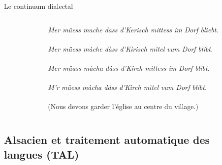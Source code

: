 \documentclass[french]{beamer}
\begin{document}
\begin{frame}{Le continuum dialectal}
  \begin{columns}
    \begin{column}{0.25\textwidth}
    \end{column}
    \begin{column}{0.85\textwidth}

      \small
      \textit{Mer müess mache dass d'Kerisch mittess im Dorf bliebt. \\~\\ %
        Mer müess màche  dàss d'Kìrisch mìtel vum Dorf blibt.\\~\\ %
        Mer müass màcha dàss d’Kîrch mittess îm Dorf blibt.\\~\\ %
        M'r müess màcha dàss d'Kìrch mìtel vum Dorf blibt.\\~\\  %
      }
      (Nous devons garder l'église au centre du village.)
    \end{column}
  \end{columns}
  \begin{center}
  \end{center}
\end{frame}

\subsection{Alsacien et traitement automatique des langues (TAL)}
\end{document}
